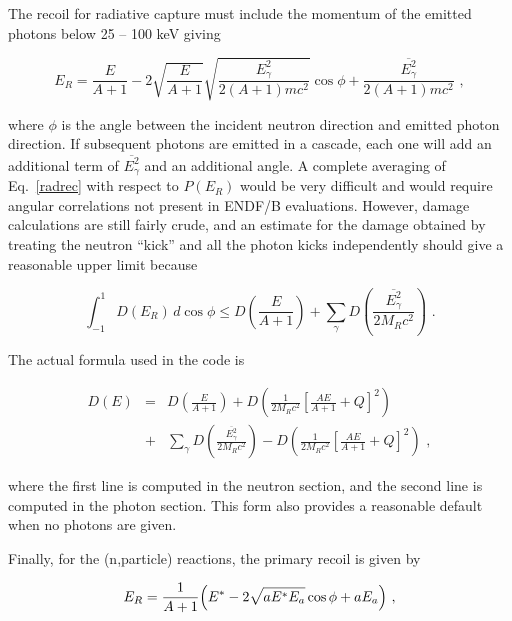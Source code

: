 The recoil for radiative capture must include the momentum of
the emitted photons below 25 -- 100 keV giving

\begin{equation}
   E_R=\frac{E}{A+1}-2\sqrt{\frac{E}{A+1}}
    \sqrt{\frac{E_\gamma^2}{2(A+1)mc^2}}\cos\phi
    +\frac{\overline{E_\gamma^2}}{2(A+1)mc^2}\,\,,
\label{radrec}
\end{equation}

\noindent
where $\phi$ is the angle between the incident neutron direction
and emitted photon direction.  If subsequent photons are emitted
in a cascade, each one will add an additional term of
$\overline{E_\gamma^2}$ and an additional angle.  A complete
averaging of Eq.~\ref{radrec} with respect to $P(E_R)$ would
be very difficult and would require angular correlations not
present in ENDF/B evaluations.  However, damage calculations are still
fairly crude, and an estimate for the damage obtained by
treating the neutron ``kick'' and all the photon kicks
independently should give a reasonable upper limit because

\begin{equation}
   \int_{-1}^1D(E_R)\,d\cos\phi\le
     D\left(\frac{E}{A+1}\right)+\sum_\gamma D\left(
      \frac{\overline{E_\gamma^2}}{2M_Rc^2}\right)\,\,.
\end{equation}

\noindent
The actual formula used in the code is

\begin{eqnarray}
   D(E)&=&D\left(\frac{E}{A+1}\right)
       +D\left(\frac{1}{2M_Rc^2}\left[\frac{AE}{A+1}
       +Q\right]^2\right) \nonumber\\
       &+&\sum_\gamma D\left(\frac{\overline{E^2_\gamma}}
        {2M_Rc^2}\right)-D\left(\frac{1}{2M_Rc^2}\left[
        \frac{AE}{A+1}+Q\right]^2\right)\,\,,
\label{D102}
\end{eqnarray}

\noindent
where the first line is computed in the neutron section, and
the second line is computed in the photon section.  This form
also provides a reasonable default when no photons are given.

Finally, for the (n,particle) reactions, the primary recoil
is given by

\begin{equation}
   E_R=\frac{1}{A+1}\Bigl(E^*-2\sqrt{aE^*E_a}\cos\phi+aE_a\Bigr)\,\,,
\label{npart}
\end{equation}
\vspace{1 pt}

